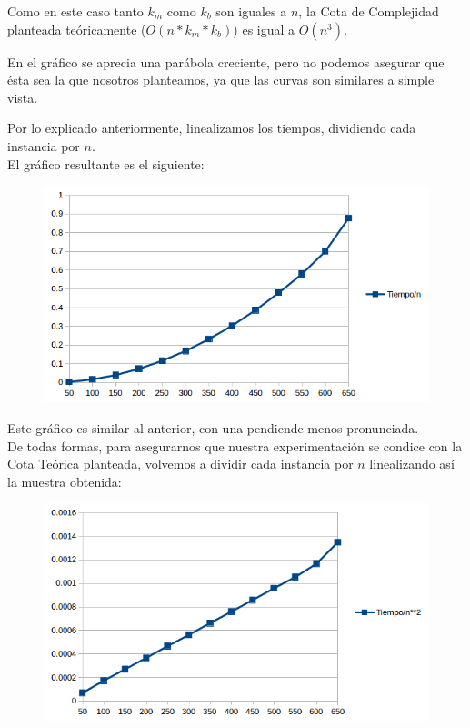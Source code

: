  Como en este caso tanto $k_m$ como $k_b$ son iguales a $n$, la Cota de Complejidad planteada te\'oricamente ($O(n* k_m* k_b)$) es igual a $O(n^3)$.
  
  En el gr\'afico se aprecia una par\'abola creciente, pero no podemos asegurar que \'esta sea la que nosotros planteamos, ya que las curvas son similares a simple vista.

      \newpage
      
        Por lo explicado anteriormente, linealizamos los tiempos, dividiendo cada instancia por $n$.\\
        
  El gr\'afico resultante es el siguiente:
  
  \begin{figure}[h!]
   \begin{center}
	\includegraphics[scale=0.8]{imagenes/ej1/peorCaso2.png}
   \end{center}
  \end{figure}
  

  
  Este gr\'afico es similar al anterior, con una pendiende menos pronunciada.\\
  
  De todas formas, para asegurarnos que nuestra experimentaci\'on se condice con la Cota Te\'orica planteada, volvemos a dividir cada instancia por $n$ linealizando as\'i la muestra obtenida:\\
  
    \begin{figure}[h!]
   \begin{center}
	\includegraphics[scale=0.8]{imagenes/ej1/peorCaso3.png}
   \end{center}
  \end{figure}
  
